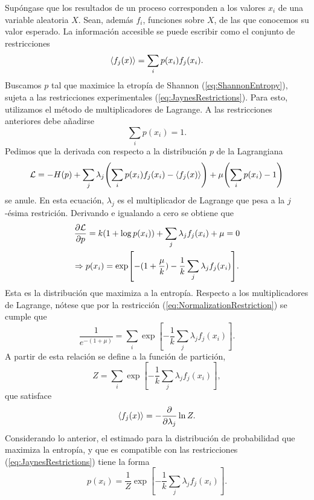 Supóngase que los resultados de un proceso corresponden a los valores $x_{i}$ de una variable aleatoria $X$. Sean, además $f_{i}$, funciones sobre $X$, de las que conocemos su valor esperado. La información accesible se puede escribir como el conjunto de restricciones
\begin{equation}\label{eq:JaynesRestrictions}
    \expval{f_{j}(x)}=\sum_{i}p(x_{i})f_{j}(x_{i}).
\end{equation}
Buscamos $p$ tal que maximice la etropía de Shannon (\ref{eq:ShannonEntropy}), sujeta a las restricciones experimentales (\ref{eq:JaynesRestrictions}). Para esto, utilizamos el método de multiplicadores de Lagrange. A las restricciones anteriores debe añadirse 
\begin{equation}\label{eq:NormalizationRestriction}
    \sum_{i}p(x_{i})=1.
\end{equation}
Pedimos que la derivada con respecto a la distribución $p$ de la Lagrangiana
\begin{equation*}
    \mathcal{L}=-H(p)+\sum_{j}\lambda_{j}\qty(\sum_{i}p(x_{i})f_{j}(x_{i})-\expval{f_{j}(x)})+\mu\qty(\sum_{i}p(x_{i})-1)
\end{equation*}
se anule. En esta ecuación, $\lambda_{j}$ es el multiplicador de Lagrange que pesa a la $j$-ésima restrición. Derivando e igualando a cero se obtiene que
\begin{gather*}
    \frac{\partial \mathcal{L}}{\partial p}=k(1+\log{p(x_{i})})+\sum_{j}\lambda_{j}f_{j}(x_{i})+\mu=0\\
    \Rightarrow p(x_{i})=\exp[-(1+\frac{\mu}{k})-\frac{1}{k}\sum_{j}\lambda_{j}f_{j}(x_{i})].
\end{gather*}
Esta es la distribución que maximiza a la entropía. Respecto a los multiplicadores de Lagrange, nótese que por la restricción (\ref{eq:NormalizationRestriction}) se cumple que
\begin{equation*}
    \frac{1}{e^{-(1+\mu)}}=\sum_{i}\exp[-\frac{1}{k}\sum_{j}\lambda_{j}f_{j}(x_{i})].
\end{equation*}
A partir de esta relación se define a la función de partición,
\begin{equation*}
    Z=\sum_{i}\exp[-\frac{1}{k}\sum_{j}\lambda_{j}f_{j}(x_{i})],
\end{equation*}
que satisface
\begin{equation*}
    \expval{f_{j}(x)}=-\frac{\partial}{\partial \lambda_{j}}\ln{Z}.
\end{equation*}
Considerando lo anterior, el estimado para la distribución de probabilidad que maximiza la entropía, y que es compatible con las restricciones (\ref{eq:JaynesRestrictions}) tiene la forma 
\begin{equation}\label{eq:MaxEntDist}
    p(x_{i})=\frac{1}{Z}\exp[-\frac{1}{k}\sum_{j}\lambda_{j}f_{j}(x_{i})].
\end{equation}


